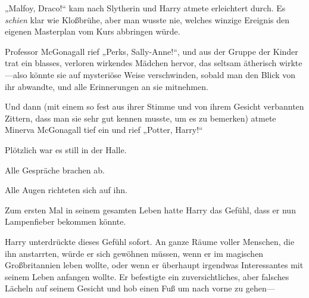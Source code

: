 „Malfoy, Draco!“ kam nach Slytherin und Harry atmete erleichtert durch. Es \emph{schien} klar wie Kloßbrühe, aber man wusste nie, welches winzige Ereignis den eigenen Masterplan vom Kurs abbringen würde.

Professor McGonagall rief „Perks, Sally-Anne!“, und aus der Gruppe der Kinder trat ein blasses, verloren wirkendes Mädchen hervor, das seltsam ätherisch wirkte—also könnte sie auf mysteriöse Weise verschwinden, sobald man den Blick von ihr abwandte, und alle Erinnerungen an sie mitnehmen.

Und dann (mit einem so fest aus ihrer Stimme und von ihrem Gesicht verbannten Zittern, dass man sie sehr gut kennen musste, um es zu bemerken) atmete Minerva McGonagall tief ein und rief „Potter, Harry!“



Plötzlich war es still in der Halle.

Alle Gespräche brachen ab.

Alle Augen richteten sich auf ihn.

Zum ersten Mal in seinem gesamten Leben hatte Harry das Gefühl, dass er nun Lampenfieber bekommen könnte.


Harry unterdrückte dieses Gefühl sofort. An ganze Räume voller Menschen, die ihn anstarrten, würde er sich gewöhnen müssen, wenn er im magischen Großbritannien leben wollte, oder wenn er überhaupt irgendwas Interessantes mit seinem Leben anfangen wollte. Er befestigte ein zuversichtliches, aber falsches Lächeln auf seinem Gesicht und hob einen Fuß um nach vorne zu gehen—

